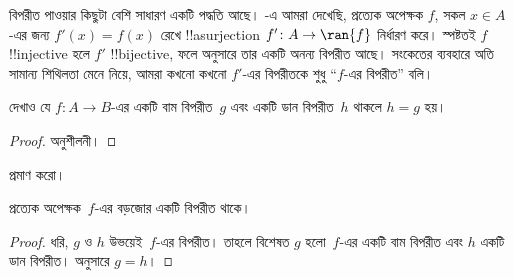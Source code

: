 \documentclass[../../../include/open-logic-section]{subfiles}
\begin{document}
\begin{explain}
বিপরীত পাওয়ার কিছুটা বেশি সাধারণ একটি পদ্ধতি আছে। -এ আমরা দেখেছি, প্রত্যেক অপেক্ষক $f$, সকল $x \in A$-এর জন্য $f'(x) = f(x)$ রেখে !!a{surjection} $f'
\colon A \to \ran{f}$ নির্ধারণ করে। স্পষ্টতই $f$ !!{injective} হলে $f'$ !!{bijective}, ফলে  অনুসারে তার একটি অনন্য বিপরীত আছে। সংকেতের ব্যবহারে অতি সামান্য শিথিলতা মেনে নিয়ে, আমরা কখনো কখনো $f'$-এর বিপরীতকে শুধু ``$f$-এর বিপরীত'' বলি।
\end{explain}

\begin{prop}%
  দেখাও যে $f\colon A \to B$-এর একটি বাম বিপরীত~$g$ এবং একটি ডান বিপরীত~$h$ থাকলে $h = g$ হয়।
\end{prop}

\begin{proof}
  অনুশীলনী।
\end{proof}

\begin{prob}
   প্রমাণ করো।
\end{prob}

\begin{prop}
প্রত্যেক অপেক্ষক~$f$-এর বড়জোর একটি বিপরীত থাকে।
\end{prop}

\begin{proof}
  ধরি, $g$ ও $h$ উভয়েই~$f$-এর বিপরীত। তাহলে বিশেষত $g$ হলো~$f$-এর একটি বাম বিপরীত এবং $h$ একটি ডান বিপরীত।  অনুসারে $g = h$।
\end{proof}
\end{document}
